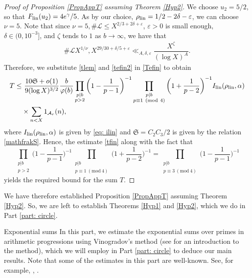 \documentclass[12pt]{amsart}
\makeatletter
\renewcommand\part{\@startsection{part}{2}%
	\z@{0.5\linespacing\@plus2\linespacing}{\linespacing}%
	{\normalfont\large\scshape\bfseries\centering}}
\numberwithin{equation}{section}
\theoremstyle{remark}
\theoremstyle{definition}
\newcommand{\imod}[1]{\ (\mathrm{mod}\ #1)}
\makeatother
\begin{document}
\begin{proof}[Proof of Proposition \ref{PropAppT} assuming Theorem \ref{Hyp2}]
We choose $u_2=5/2$, so that $F_{\textup{lin}}(u_2)=4e^\gamma/5$. As by our choice, $\rho_{\textup{lin}}=1/2-2\delta-\varepsilon$, we can choose $\nu=5$.  Note that since $\nu=5, \#\mathcal{L} \leq X^{2/3+2\delta+\varepsilon}$, $\varepsilon>0$ is small enough, $\delta\in (0, 10^{-3}]$, and $\zeta$ tends to $1$ as $b \rightarrow \infty$, we have that
\begin{align}\label{tefin2}
\#\mathcal{L}X^{1/\nu}, X^{29/30+\delta/5+\varepsilon}  \ll_{A, \delta, \varepsilon} \dfrac{X^\zeta}{(\log X)^A}.
\end{align}
Therefore, we substitute \eqref{tlem} and \eqref{tefin2} in \eqref{Tefin} to obtain
\begin{equation}
\begin{aligned}
\label{tfin} T\leq &~\dfrac{10\mathfrak{S}+o(1)}{9(\log X)^{3/2}} \dfrac{b}{\varphi(b)}\prod_{\substack{p|b\\p>2}}\bigg(1-\dfrac{1}{p-1}\bigg)^{-1}\prod_{\substack{p|b\\p\equiv 1\imod 4}}\bigg(1+\dfrac{1}{p-2}\bigg)^{-1}I_{\textup{lin}}(\rho_{\textup{lin}}, \alpha)\\
&\times \sum_{\substack{n<X}}1_{\mathcal{A}_r}(n),
\end{aligned}
\end{equation}
where $I_{\textup{lin}}(\rho_{\textup{lin}}, \alpha)$ is given by \eqref{eq: ilin} and $\mathfrak{S}=C_2C_3/2$ is given by the relation \eqref{mathfrakS}. Hence, the estimate \eqref{tfin} along with the fact that 
\[\prod_{\substack{p|b\\p>2}}\bigg(1-\dfrac{1}{p-1}\bigg)^{-1}\prod_{\substack{p|b\\p\equiv 1\imod 4}}\bigg(1+\dfrac{1}{p-2}\bigg)^{-1}=\prod_{\substack{p|b\\p\equiv 3\imod 4}}\bigg(1-\dfrac{1}{p-1}\bigg)^{-1}\]
yields the required bound for the sum $T$. 
\end{proof}

We have therefore established Proposition \ref{PropAppT} assuming Theorem \ref{Hyp2}. So, we are left to establish Theorems \ref{Hyp1} and \ref{Hyp2}, which we do in Part \ref{part: circle}.


\part{Exponential sums}\label{part: exp sum}
In this part, we estimate the exponential sums over primes in arithmetic progressions using Vinogradov's method (see \cite[Chapter 23]{kou} for an introduction to the method), which we will employ in Part \ref{part: circle} to deduce our main results. Note that some of the estimates in this part are well-known. See, for example, \cite{Mat}, \cite{Mik}.
\end{document}
